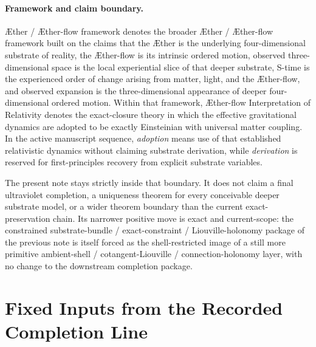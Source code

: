 \documentclass[11pt]{article}
\newcommand{\Aether}{\AE{}ther}
\newcommand{\Aflow}{\AE{}ther-flow}
\newcommand{\TheoryName}{\Aflow{} Interpretation of Relativity}
\newcommand{\TheoryProgram}{\Aether{} / \Aflow{} framework}
\begin{document}
\paragraph{Framework and claim boundary.}
\TheoryProgram{} denotes the broader \Aether{} / \Aflow{} framework built on the claims that the \Aether{} is the underlying four-dimensional substrate of reality, the \Aflow{} is its intrinsic ordered motion, observed three-dimensional space is the local experiential slice of that deeper substrate, S-time is the experienced order of change arising from matter, light, and the \Aflow{}, and observed expansion is the three-dimensional appearance of deeper four-dimensional ordered motion. Within that framework, \TheoryName{} denotes the exact-closure theory in which the effective gravitational dynamics are adopted to be exactly Einsteinian with universal matter coupling. In the active manuscript sequence, \emph{adoption} means use of that established relativistic dynamics without claiming substrate derivation, while \emph{derivation} is reserved for first-principles recovery from explicit substrate variables.

The present note stays strictly inside that boundary. It does not claim a final ultraviolet completion, a uniqueness theorem for every conceivable deeper substrate model, or a wider theorem boundary than the current exact-preservation chain. Its narrower positive move is exact and current-scope: the constrained substrate-bundle / exact-constraint / Liouville-holonomy package of the previous note is itself forced as the shell-restricted image of a still more primitive ambient-shell / cotangent-Liouville / connection-holonomy layer, with no change to the downstream completion package.

\section{Fixed Inputs from the Recorded Completion Line}
\end{document}
